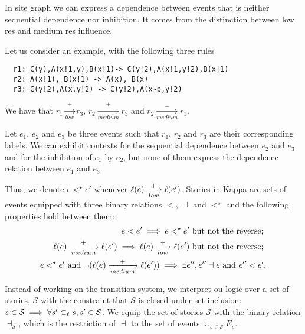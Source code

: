 \begin{remark}
In site graph we can express a dependence between events that is neither sequential dependence nor inhibition. It comes from the distinction between low res and medium res influence.

Let us consider an example, with the following three rules

\begin{verbatim}
  r1: C(y),A(x!1,y),B(x!1)-> C(y!2),A(x!1,y!2),B(x!1)
  r2: A(x!1), B(x!1) -> A(x), B(x)
  r3: C(y!2),A(x,y!2) -> C(y!2),A(x~p,y!2)
\end{verbatim}

We have that $r_1\xrightarrow[low]{+} r_3$, $r_2\xrightarrow[medium]{+} r_3$ and $r_2\xrightarrow[medium]{-} r_1$.

Let $e_1$, $e_2$ and $e_3$ be three events such that $r_1$, $r_2$ and $r_3$ are their corresponding labels. We can exhibit contexts for the sequential dependence between $e_2$ and $e_3$ and for the inhibition of $e_1$ by $e_2$, but none of them express the dependence relation between $e_1$ and $e_3$.

Thus, we denote $e<^{\star}e'$ whenever $\ell(e)\xrightarrow[low]{+} \ell(e')$. Stories in Kappa are sets of events equipped with three binary relations $<$, $\dashv$ and $<^{\star}$ and the following properties hold between them:
\begin{align*}
  e < e' \implies e<^{\star}e'\text{ but not the reverse; }\\
\ell(e)\xrightarrow[medium]{+} \ell(e') \implies \ell(e)\xrightarrow[low]{+} \ell(e')\text{ but not the reverse; }\\
  e<^{\star}e'\text{ and }\neg(\ell(e)\xrightarrow[medium]{+} \ell(e'))\implies \exists e'', e''\dashv e\text{ and }e''< e'.
\end{align*}
\end{remark}

Instead of working on the transition system, we interpret ou logic over a set of stories, $\mathcal{S}$ with the constraint that $\mathcal{S}$ is closed under set inclusion: $s\in \mathcal{S} \implies \forall s'\subset_{\ell} s, s'\in\mathcal{S}$. We equip the set of stories $\mathcal{S}$ with the binary relation $\dashv_{\mathcal{S}}$, which is the restriction of $\dashv$ to the set of events $\cup_{s\in\mathcal{S}} E_s$.

